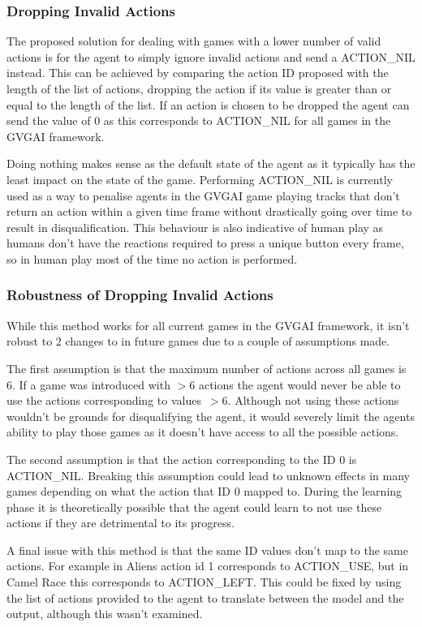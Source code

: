 \subsubsection{Dropping Invalid Actions}
The proposed solution for dealing with games with a lower number of valid actions is for the agent to simply ignore invalid actions and send a ACTION\_NIL instead.
This can be achieved by comparing the action ID proposed with the length of the list of actions, dropping the action if its value is greater than or equal to the length of the list.
If an action is chosen to be dropped the agent can send the value of 0 as this corresponds to ACTION\_NIL for all games in the GVGAI framework.
\par
Doing nothing makes sense as the default state of the agent as it typically has the least impact on the state of the game.
Performing ACTION\_NIL is currently used as a way to penalise agents in the GVGAI game playing tracks that don't return an action within a given time frame without drastically going over time to result in disqualification.
This behaviour is also indicative of human play as humans don't have the reactions required to press a unique button every frame, so in human play most of the time no action is performed.
\subsubsection{Robustness of Dropping Invalid Actions}
While this method works for all current games in the GVGAI framework, it isn't robust to 2 changes to in future games due to a couple of assumptions made.
\par
The first assumption is that the maximum number of actions across all games is 6.
If a game was introduced with $>6$ actions the agent would never be able to use the actions corresponding to values~$>6$.
Although not using these actions wouldn't be grounds for disqualifying the agent, it would severely limit the agents ability to play those games as it doesn't have access to all the possible actions.
\par
The second assumption is that the action corresponding to the ID 0 is ACTION\_NIL.
Breaking this assumption could lead to unknown effects in many games depending on what the action that ID 0 mapped to.
During the learning phase it is theoretically possible that the agent could learn to not use these actions if they are detrimental to its progress.
\par
A final issue with this method is that the same ID values don't map to the same actions.
For example in Aliens action id 1 corresponds to ACTION\_USE, but in Camel Race this corresponds to ACTION\_LEFT.
This could be fixed by using the list of actions provided to the agent to translate between the model and the output, although this wasn't examined.

